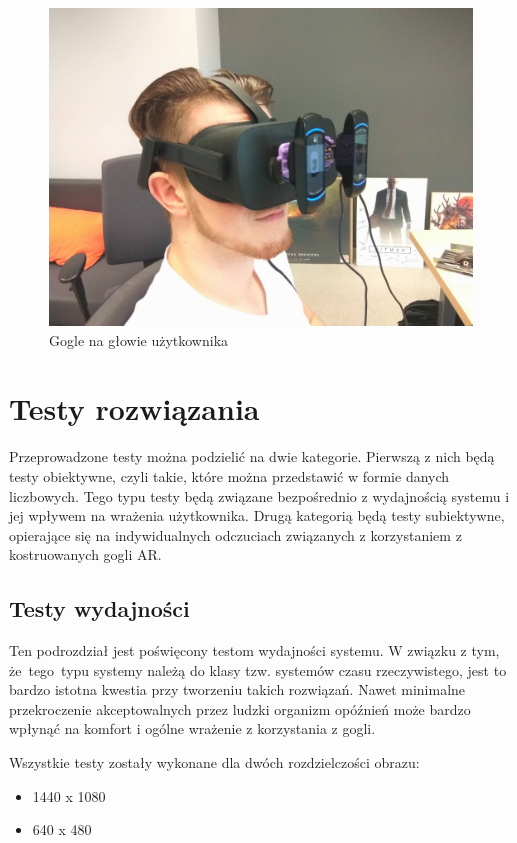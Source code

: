 \documentclass[a4paper,11pt,twoside]{report}
\theoremstyle{definition}
\begin{document}
\begin{figure}[H]
\centering
\includegraphics[scale=0.2]{images/googleWithCameras}
\caption[Skonstruowane gogle]{Gogle na głowie użytkownika}
\end{figure}

\section{Testy rozwiązania}
Przeprowadzone testy można podzielić na dwie kategorie. Pierwszą z nich będą testy obiektywne, czyli takie, które można przedstawić w formie danych liczbowych. Tego typu testy będą związane bezpośrednio z wydajnością systemu i jej wpływem na wrażenia użytkownika. Drugą kategorią będą testy subiektywne, opierające się na indywidualnych odczuciach związanych z korzystaniem z kostruowanych gogli AR. 

\subsection{Testy wydajności}
Ten podrozdział jest poświęcony testom wydajności systemu. W związku z tym, że~tego~typu systemy należą do klasy tzw. systemów czasu rzeczywistego, jest to bardzo istotna kwestia przy tworzeniu takich rozwiązań. Nawet minimalne przekroczenie akceptowalnych przez ludzki organizm opóźnień może bardzo wpłynąć na komfort i ogólne wrażenie z korzystania z gogli.

Wszystkie testy zostały wykonane dla dwóch rozdzielczości obrazu:
\begin{itemize}
\item 1440 x 1080
\item 640 x 480
\end{itemize}
\end{document}
